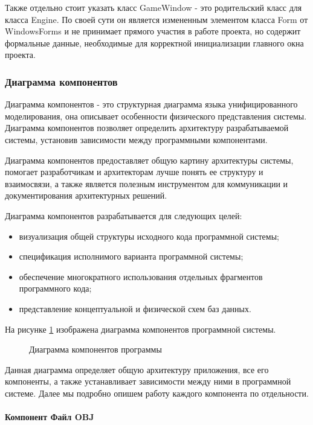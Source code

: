Также отдельно стоит указать класс GameWindow - это родительский класс для класса Engine. По своей сути он является измененным элементом класса Form от WindowsForms и не принимает прямого участия в работе проекта, но содержит формальные данные, необходимые для корректной инициализации главного окна проекта.

\subsubsection{Диаграмма компонентов}

Диаграмма компонентов - это структурная диаграмма языка унифицированного моделирования, она описывает особенности физического представления системы. Диаграмма компонентов позволяет определить архитектуру разрабатываемой системы, установив зависимости между программными компонентами.

Диаграмма компонентов предоставляет общую картину архитектуры системы, помогает разработчикам и архитекторам лучше понять ее структуру и взаимосвязи, а также является полезным инструментом для коммуникации и документирования архитектурных решений.

Диаграмма компонентов разрабатывается для следующих целей:
\begin{itemize}
	\item визуализация общей структуры исходного кода программной системы;
	\item спецификация исполнимого варианта программной системы;
	\item обеспечение многократного использования отдельных фрагментов программного кода;
	\item представление концептуальной и физической схем баз данных.
\end{itemize}

На рисунке \ref{diagram5:image} изображена диаграмма компонентов программной системы.
\begin{figure}[ht]
\caption{Диаграмма компонентов программы}
\label{diagram5:image}
\end{figure}

Данная диаграмма определяет общую архитектуру приложения, все его компоненты, а также устанавливает зависимости между ними в программной системе. Далее мы подробно опишем работу каждого компонента по отдельности.

\paragraph{Компонент Файл OBJ}

